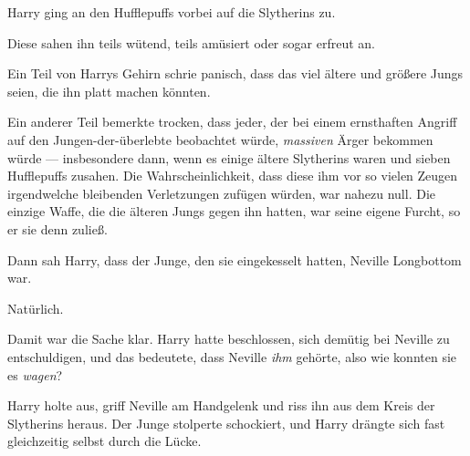 Harry ging an den Hufflepuffs vorbei auf die Slytherins zu.

Diese sahen ihn teils wütend, teils amüsiert oder sogar erfreut an.

Ein Teil von Harrys Gehirn schrie panisch, dass das viel ältere und größere Jungs seien, die ihn platt machen könnten.

Ein anderer Teil bemerkte trocken, dass jeder, der bei einem ernsthaften Angriff auf den Jungen-der-überlebte beobachtet würde, \emph{massiven} Ärger bekommen würde — insbesondere dann, wenn es einige ältere Slytherins waren und sieben Hufflepuffs zusahen. Die Wahrscheinlichkeit, dass diese ihm vor so vielen Zeugen irgendwelche bleibenden Verletzungen zufügen würden, war nahezu null. Die einzige Waffe, die die älteren Jungs gegen ihn hatten, war seine eigene Furcht, so er sie denn zuließ.

Dann sah Harry, dass der Junge, den sie eingekesselt hatten, Neville Longbottom war.

Natürlich.

Damit war die Sache klar. Harry hatte beschlossen, sich demütig bei Neville zu entschuldigen, und das bedeutete, dass Neville \emph{ihm} gehörte, also wie konnten sie es \emph{wagen}?

Harry holte aus, griff Neville am Handgelenk und riss ihn aus dem Kreis der Slytherins heraus. Der Junge stolperte schockiert, und Harry drängte sich fast gleichzeitig selbst durch die Lücke.

